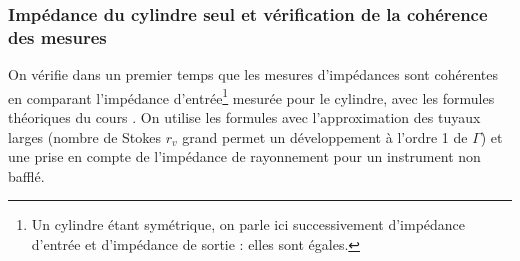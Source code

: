 \documentclass[atiam, article]{rapport} %
\begin{document}

\subsubsection{Impédance du cylindre seul et vérification de la cohérence des mesures}

On vérifie dans un premier temps que les mesures d'impédances sont cohérentes en comparant l'impédance d'entrée\footnote{Un cylindre étant symétrique, on parle ici successivement d'impédance d'entrée et d'impédance de sortie : elles sont égales.} mesurée pour le cylindre, avec les formules théoriques du cours \cite{Vergez4}. On utilise les formules avec l'approximation des tuyaux larges (nombre de Stokes $r_v$ grand permet un développement à l'ordre 1 de $\Gamma$) et une prise en compte de l'impédance de rayonnement pour un instrument non bafflé.
\end{document}
